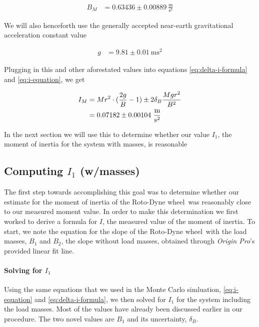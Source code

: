\documentclass[coverpage]{article}
\newcommand{\softwareText}[1]{\textit{#1}\texttrademark}
\newcommand{\origin}{\softwareText{Origin Pro}}
\newcommand{\rwheel}{Roto-Dyne wheel}
\newcommand{\mpssq}{\frac{\text{m}}{\text{s}^2}}
\begin{document}
	\begin{align}
		B_M &= 0.63436 \pm 0.00889\ \mpssq
	\end{align}
	
	We will also henceforth use the generally accepted near-earth gravitational acceleration constant value
	
	\begin{align}
		g &= 9.81 \pm 0.01\ \text{m} \text{s}^2 \label{eq:def-g}
	\end{align}
	
	Plugging in this and other aforestated values into equations \ref{eq:delta-i-formula} and \ref{eq:i-equation}, we get
	
	\begin{align}
		I_M &= Mr^2 \cdot (\frac{2g}{B} - 1) \pm 2 \delta_B \frac{M g r^2}{B^2} \notag \\
		&= 0.07182 \pm 0.00104\ \mpssq
	\end{align}

	In the next section we will use this to determine whether our value $I_1$, the moment of inertia for the system with masses, is reasonable
	
	\subsection{Computing $I_1$ (w/masses)}
	
	The first step towards accomplishing this goal was to determine whether our estimate for the moment of inertia of the \rwheel~was reasonably close to our measured moment value. In order to make this determination we first worked to derive a formula for $I$, the measured value of the moment of inertia. To start, we note the equation for the slope of the \rwheel~with the load masses, $B_1$ and $B_2$, the slope without load masses, obtained through \origin's provided linear fit line.

	\newcommand{\massSlopeUncert}{\delta_B}

	\paragraph{Solving for $I_1$}
	
	Using the same equations that we used in the Monte Carlo simluation, \ref{eq:i-equation} and \ref{eq:delta-i-formula}, we then solved for $I_1$ for the system including the load masses. Most of the values have already been discussed earlier in our procedure. The two novel values are $B_1$ and its uncertainty, $\delta_B$.
	
\end{document}
